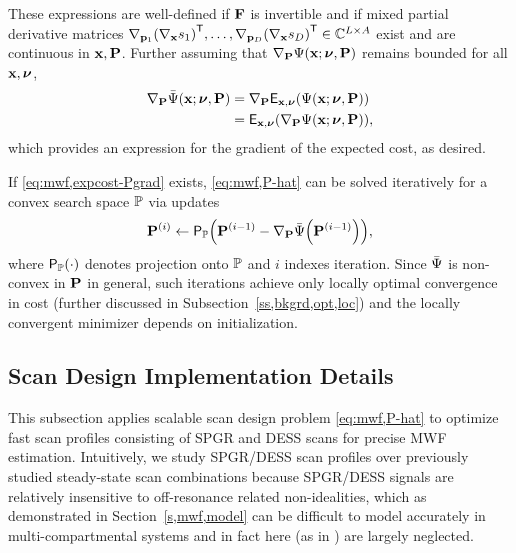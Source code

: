 These expressions are well-defined 
if $\mathbf{F}$ is invertible 
and if mixed partial derivative matrices
$\grada{\bmp_1}{\paren{\grada{\bmx}{s_1}}\tpose},
\dots,
\grada{\bmp_D}{\paren{\grada{\bmx}{s_D}}\tpose}
\in \complexes{L \times A}$
exist and are continuous in $\mathbf{x},\mathbf{P}$. 
Further assuming 
that $\grada{\bmP}{\costa{\bmx; \bmnu, \bmP}}$ remains bounded 
for all $\mathbf{x},\boldsymbol{\nu}$, 
\begin{align}
	\grada{\bmP}{\expcost\paren{\bmx; \bmnu, \bmP}} 
		&= 
		\grada{\bmP}{\expect{\bmx,\bmnu}{\costa{\bmx; \bmnu, \bmP}}}
		\nonumber \\
		&= 
		\expect{\bmx,\bmnu}{\grada{\bmP}{\costa{\bmx; \bmnu, \bmP}}},
		\label{eq:mwf,expcost-Pgrad}
\end{align} 
which provides an expression
for the gradient of the expected cost,
as desired.

If \eqref{eq:mwf,expcost-Pgrad} exists,
\eqref{eq:mwf,P-hat} can be solved iteratively
for a convex search space $\mathbb{P}$
via updates
\begin{align}
	\iter{\bmP}{i} \gets 
		\proja{\setP}{\iter{\bmP}{i-1}-\grada{\bmP}{\expcost\paren{\iter{\bmP}{i-1}}}},
		\label{eq:mwf,P-iter}
\end{align}
where $\proja{\setP}{\cdot}$ denotes projection onto $\mathbb{P}$
and $i$ indexes iteration.
Since $\bar{\Psi}$ is non-convex in $\mathbf{P}$ in general,
such iterations achieve
only locally optimal convergence in cost
(further discussed in Subsection~\ref{ss,bkgrd,opt,loc})
and the locally convergent minimizer
depends on initialization.

\subsection{Scan Design Implementation Details}
\label{ss,mwf,acq,detail}

This subsection applies 
scalable scan design problem \eqref{eq:mwf,P-hat}
to optimize fast scan profiles 
consisting of SPGR and DESS scans
for precise MWF estimation.
Intuitively,
we study SPGR/DESS scan profiles
over previously studied steady-state scan combinations
\cite{deoni:08:gmt, deoni:11:com, deoni:13:oct}
because SPGR/DESS signals
are relatively insensitive
to off-resonance related non-idealities,
which as demonstrated 
in Section~\ref{s,mwf,model}
can be difficult
to model accurately 
in multi-compartmental systems
and in fact here 
(as in \cite{deoni:11:com, deoni:13:oct})
are largely neglected.

